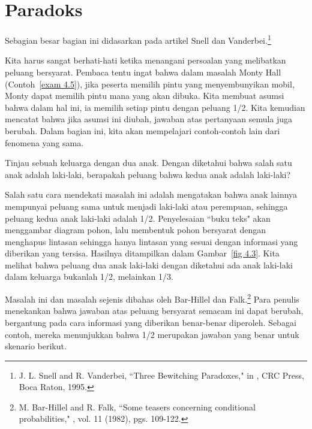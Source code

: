 \section{Paradoks}\label{sec 4.3}

Sebagian besar bagian ini didasarkan pada artikel Snell dan Vanderbei.\footnote{J. L. Snell and R. Vanderbei, ``Three Bewitching
Paradoxes," in , CRC Press, Boca
Raton, 1995.}
\par
Kita harus sangat berhati-hati ketika menangani persoalan yang melibatkan peluang
bersyarat.  Pembaca tentu ingat bahwa dalam masalah Monty Hall
(Contoh~\ref{exam 4.5}), jika peserta memilih pintu yang menyembunyikan mobil, Monty
dapat memilih pintu mana yang akan dibuka.  Kita membuat asumsi bahwa dalam hal ini,
ia memilih setiap pintu dengan peluang 1/2.  Kita kemudian mencatat bahwa jika asumsi
ini diubah, jawaban atas pertanyaan semula juga berubah.  Dalam bagian ini, kita akan
mempelajari contoh-contoh lain dari fenomena yang sama.

\begin{example}\label{exam 4.3.1}
Tinjau sebuah keluarga dengan dua anak.  Dengan diketahui bahwa salah satu anak
adalah laki-laki, berapakah peluang bahwa kedua anak adalah laki-laki?
\par
Salah satu cara mendekati masalah ini adalah mengatakan bahwa anak lainnya mempunyai
peluang sama untuk menjadi laki-laki atau perempuan, sehingga peluang kedua anak
laki-laki adalah 1/2.  Penyelesaian ``buku teks" akan menggambar diagram pohon, lalu
membentuk pohon bersyarat dengan menghapus lintasan sehingga hanya lintasan yang
sesuai dengan informasi yang diberikan yang tersisa.  Hasilnya ditampilkan dalam
Gambar~\ref{fig 4.3}. Kita melihat bahwa peluang dua anak laki-laki dengan diketahui
ada anak laki-laki dalam keluarga bukanlah 1/2, melainkan 1/3.
\end{example}

Masalah ini dan masalah sejenis dibahas oleh Bar-Hillel dan
Falk.\footnote{M. Bar-Hillel and R. Falk, ``Some teasers
concerning conditional probabilities," , vol. 11 (1982), pgs. 109-122.} Para
penulis menekankan bahwa jawaban atas peluang bersyarat semacam ini dapat berubah,
bergantung pada cara informasi yang diberikan benar-benar diperoleh.  Sebagai contoh,
mereka menunjukkan bahwa 1/2 merupakan jawaban yang benar untuk skenario berikut.

